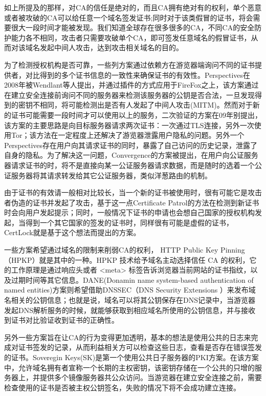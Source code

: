 如上所提及的那样，对CA的信任是绝对的，而且CA拥有绝对有的权利，单个恶意或者被攻破的CA可以给任意一个域名签发证书\supercite{ducklin2013turktrust};同时对于该类假冒的证书，将会需要很大一段时间才能被发现。我们知道全球存在很多很多的CA，不同CA的安全防护能力各不相同，攻击者只需要攻破单个CA，即可签发任意域名的假冒证书，从而对该域名发起中间人攻击，达到攻击相关域名的目的。


为了检测授权机构是否可靠，一些列方案通过依赖方在游览器端询问不同的证书提供者，对比得到的多个证书信息的一致性来确保证书的有效性。Perspectives\supercite{wendlandt2008perspectives}在2008年被Wendlant等人提出，并通过插件的方式应用于FireFox之上，该方案通过在建立安全连接前询问不同的服务器来检测该服务器的公钥是否合法，一旦发现得到的密钥不相同，将可能检测出是否有人发起了中间人攻击(MITM)。然而对于新的证书可能需要一段时间才可以使用以上的服务，二次验证\supercite{alicherry2009doublecheck}的方案在09年别提出，该方案的主要思路是向目标服务器请求两次证书：一次通过TLS连接，另外一次使用Tor\supercite{alicherry2009doublecheck}；该方法在一定程度上还解决了游览器泄露用户隐私的问题。另外一个Perspectives存在用户向其请求证书的同时，暴露了自己访问的历史记录，泄露了自身的隐私。为了解决这一问题，Convergence\supercite{convergence}的方案被提出，在用户向公证服务器请求证书的时，将不是直接向某一公证服务器请求数据，而是随时的选着一个公证服务器将其请求转发给其它公证服务器，类似洋葱路由的机制。

由于证书的有效请一般相对比较长，当一个新的证书被使用时，很有可能它是攻击者伪造的证书并发起了攻击，基于这一点Certificate Patrol\supercite{modell2014certificate}的方法在检测到新证书时会向用户发起提示；同时，一般情况下证书的申请也会想自己国家的授权机构发起，当得到一个其它国家的签发的证书时，同样很有可能是虚假的证书，CertLock\supercite{soghoian2011certified}就是基于这个想法而提出的方案。%

一些方案希望通过域名的限制来削弱CA的权利， HTTP Public Key Pinning（HPKP）\supercite{evans2015public}就是其中的一种。HPKP 技术给予域名主动选择信任 CA 的权利，它的工作原理是通过响应头或者 <meta> 标签告诉浏览器当前网站的证书指纹，以及过期时间等其它信息。DANE(Donamin name system-based authentication of named entities)\supercite{barnes2011dane}方案则希望借助DNSSEC（DNS
 Security Extensions
 ）来发布域名相关的公钥信息；也就是说，域名可以将其公钥保存在DNS记录中，当游览器发起DNS解析服务的时候，就能够获取到相应域名所使用的公钥信息，并与接收到证书对比验证收到证书的正确性。%

另外一些方案旨在让CA的行为变得更加透明，基本的想法是使用公共的日志来完成对证书签发的记录，从而利益相关方可以检查这些日志，查看是否存在错误签发的证书。Soveregin Keys(SK)\supercite{eckersley2012internet}是第一个使用公共日子服务器的PKI方案。在该方案中，允许域名拥有者宣称一个长期的主权密钥，该密钥存储在一个公共的只增的服务器上，并提供多个镜像服务器共公众访问。当游览器在建立安全连接之前，需要检查使用的证书是否被主权公钥签名，失败的情况下将不会成功建立连接。


